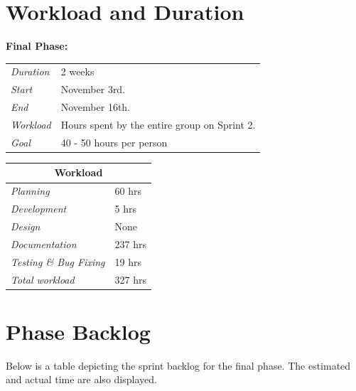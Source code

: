 \section{Workload and Duration}
\label{sec:FinalWorkload}
%
\begin{minipage}{\linewidth}
\centering
\setlength{\tabcolsep}{22pt}
\textbf{Final Phase:} 
\smallskip
{}
\begin{tabular}{ |l l| }
	\hline
	\it{Duration} & 2 weeks \\
	\it{Start} & November 3rd. \\
	\it{End} & November 16th. \\
	\it{Workload} & Hours spent by the entire group on Sprint 2. \\
	\it{Goal} & 40 - 50 hours per person \\
	\hline
\end{tabular}
\end{minipage}
\bigskip
%
\begin{minipage}{\linewidth}
\setlength{\tabcolsep}{25pt}
\centering
{}
\begin{tabular}{ |l|l| }
	\hline
	\multicolumn{2}{|c|}{\cellcolor{gray!25} Workload} \\
	\hline
	\it{Planning} & 60 hrs \\
	\it{Development} & 5 hrs \\
	\it{Design} & None \\
	\it{Documentation} & 237 hrs \\
	\it{Testing \& Bug Fixing} & 19 hrs \\
	\hline
	\it{Total workload} & 327 hrs \\
	\hline
\end{tabular}
\end{minipage}

\section{Phase Backlog}
\label{sec:FinalBacklog}

Below is a table depicting the sprint backlog for the final phase. The estimated and actual time are also displayed.

